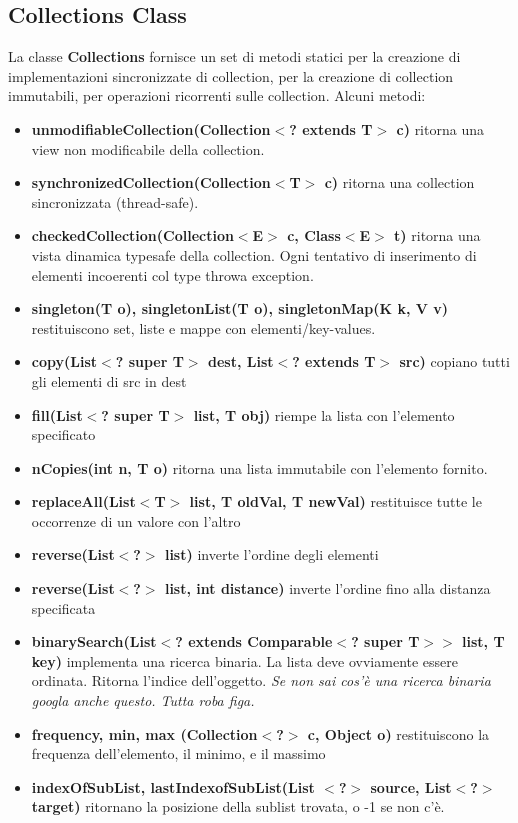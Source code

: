 \documentclass[11pt]{article}
\begin{document}
\subsection{Collections Class}
La classe \textbf{Collections} fornisce un set di metodi statici per la creazione di implementazioni sincronizzate di collection, per la creazione di collection immutabili, per operazioni ricorrenti sulle collection.
Alcuni metodi:
\begin{itemize}
    \item \textbf{unmodifiableCollection(Collection$<$? extends T$>$ c)} ritorna una view non modificabile della collection. 
    \item \textbf{synchronizedCollection(Collection$<$T$>$ c)} ritorna una collection sincronizzata (thread-safe).
    \item \textbf{checkedCollection(Collection$<$E$>$ c, Class$<$E$>$ t)} ritorna una vista dinamica typesafe della collection. Ogni tentativo di inserimento di elementi incoerenti col type throwa exception.
    \item \textbf{singleton(T o), singletonList(T o), singletonMap(K k, V v)} restituiscono set, liste e mappe con elementi/key-values.
    \item \textbf{copy(List$<$? super T$>$ dest, List$<$? extends T$>$ src)} copiano tutti gli elementi di src in dest 
    \item \textbf{fill(List$<$? super T$>$ list, T obj)} riempe la lista con l'elemento specificato 
    \item \textbf{nCopies(int n, T o)} ritorna una lista immutabile con l'elemento fornito.
    \item \textbf{replaceAll(List$<$T$>$ list, T oldVal, T newVal)} restituisce tutte le occorrenze di un valore con l'altro 
    \item \textbf{reverse(List$<$?$>$ list)} inverte l'ordine degli elementi
    \item \textbf{reverse(List$<$?$>$ list, int distance)} inverte l'ordine fino alla distanza specificata
    \item \textbf{binarySearch(List$<$? extends Comparable$<$? super T$>$$>$ list, T key)} implementa una ricerca binaria. La lista deve ovviamente essere ordinata. Ritorna l'indice dell'oggetto. \textit{Se non sai cos'è una ricerca binaria googla anche questo. Tutta roba figa.}
    \item \textbf{frequency, min, max (Collection$<$?$>$ c, Object o)} restituiscono la frequenza dell'elemento, il minimo, e il massimo
    \item \textbf{indexOfSubList, lastIndexofSubList(List $<$?$>$ source, List$<$?$>$ target)} ritornano la posizione della sublist trovata, o -1 se non c'è. 
\end{itemize}
\end{document}
